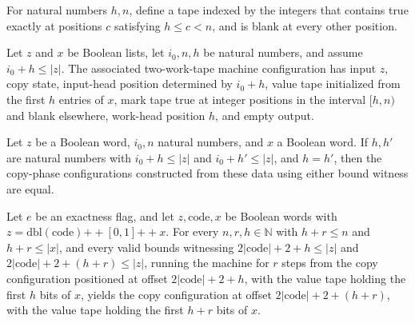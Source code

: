 \begin{definition}
\label{BoolCircuit.CircuitEval.onesFrom}
\leanok
For natural numbers $h,n$, define a tape indexed by the integers that contains true
exactly at positions $c$ satisfying $h\le c<n$, and is blank at every other position.
\end{definition}

\begin{definition}
\label{BoolCircuit.CircuitEval.cfC}
\leanok
{}
Let $z$ and $x$ be Boolean lists, let $i_0,n,h$ be natural numbers, and assume $i_0+h\le
|z|$. The associated two-work-tape machine configuration has input $z$, copy state,
input-head position determined by $i_0+h$, value tape initialized from the first $h$
entries of $x$, mark tape true at integer positions in the interval $[h,n)$ and blank
elsewhere, work-head position $h$, and empty output.
\end{definition}

\begin{theorem}
\label{BoolCircuit.CircuitEval.cfC_congr}
\leanok
{}
Let $z$ be a Boolean word, $i_0,n$ natural numbers, and $x$ a Boolean word. If $h,h'$
are natural numbers with $i_0+h\le |z|$ and $i_0+h'\le |z|$, and $h=h'$, then the
copy-phase configurations constructed from these data using either bound witness are
equal.
\end{theorem}

\begin{theorem}
\label{BoolCircuit.CircuitEval.copy_run}
\leanok
{}
Let $e$ be an exactness flag, and let $z,\mathrm{code},x$ be Boolean words with
$z=\mathrm{dbl}(\mathrm{code})\mathbin{++}[0,1]\mathbin{++}x$. For every
$n,r,h\in\mathbb{N}$ with $h+r\le n$ and $h+r\le |x|$, and every valid bounds witnessing
$2|\mathrm{code}|+2+h\le |z|$ and $2|\mathrm{code}|+2+(h+r)\le |z|$, running the machine
for $r$ steps from the copy configuration positioned at offset $2|\mathrm{code}|+2+h$,
with the value tape holding the first $h$ bits of $x$, yields the copy configuration at
offset $2|\mathrm{code}|+2+(h+r)$, with the value tape holding the first $h+r$ bits of
$x$.
\end{theorem}

